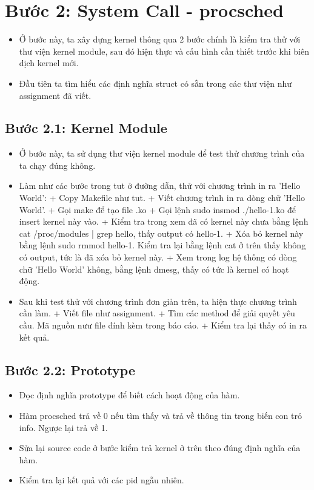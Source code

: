 \section{Bước 2: System Call - procsched}

\begin{itemize}
	\item Ở bước này, ta xây dựng kernel thông qua 2 bước chính là kiểm tra thử với thư viện kernel module, sau đó hiện thực và cấu hình cần thiết trước khi biên dịch kernel mới.
	\item Đầu tiên ta tìm hiểu các định nghĩa struct có sẵn trong các thư viện như assignment đã viết.
\end{itemize}

\subsection{Bước 2.1: Kernel Module}

\begin{itemize}
	\item Ở bước này, ta sử dụng thư viện kernel module để test thử chương trình của ta chạy đúng không.
	\item Làm như các bước trong tut ở đường dẫn, thử với chương trình in ra 'Hello World':
	\subitem + Copy Makefile như tut.
	\subitem + Viết chương trình in ra dòng chữ 'Hello World'.
	\subitem + Gọi make để tạo file .ko
	\subitem + Gọi lệnh sudo insmod ./hello-1.ko để insert kernel này vào.
	\subitem + Kiểm tra trong xem đã có kernel này chưa bằng lệnh  cat /proc/modules | grep hello, thấy output có hello-1.
	\subitem + Xóa bỏ kernel này bằng lệnh sudo rmmod hello-1. Kiểm tra lại bằng lệnh cat ở trên thấy không có output, tức là đã xóa bỏ kernel này.
	\subitem + Xem trong log hệ thống có dòng chữ 'Hello World' không, bằng lệnh dmesg, thấy có tức là kernel có hoạt động.
	
	\item Sau khi test thử với chương trình đơn giản trên, ta hiện thực chương trình cần làm.
	\subitem + Viết file như assignment.
	\subitem + Tìm các method để giải quyết yêu cầu. Mã nguồn nưư file đính kèm trong báo cáo.
	\subitem + Kiểm tra lại thấy có in ra kết quả.
\end{itemize}


\subsection{Bước 2.2: Prototype}

\begin{itemize}
	\item Đọc định nghĩa prototype để biết cách hoạt động của hàm.
	\item Hàm procsched trả về 0 nếu tìm thấy và trả về thông tin trong biến con trỏ info. Ngược lại trả về 1.
	\item Sửa lại source code ở bước kiểm trả kernel ở trên theo đúng định nghĩa của hàm.
	\item Kiểm tra lại kết quả với các pid ngẫu nhiên.
\end{itemize}


